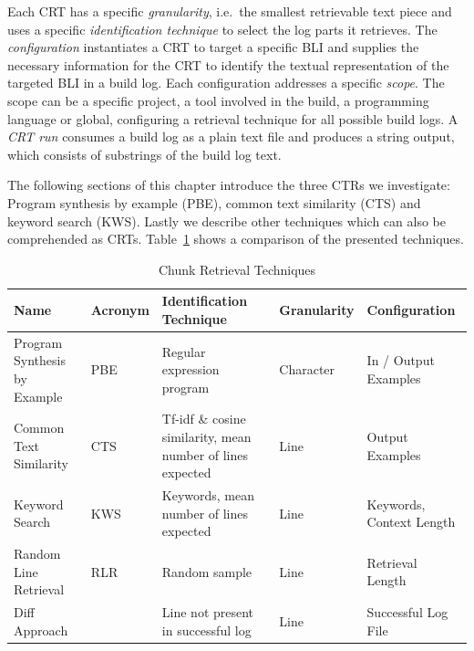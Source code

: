 \documentclass[\myrootdir/main.tex]{subfiles}
\begin{document}
Each CRT has a specific \textit{granularity}, i.e.\ the smallest retrievable text piece and uses a specific \textit{identification technique} to select the log parts it retrieves.
The \textit{configuration} instantiates a CRT to target a specific BLI and supplies the necessary information for the CRT to identify the textual representation of the targeted BLI in a build log.
Each configuration addresses a specific \textit{scope}.
The scope can be a specific project, a tool involved in the build, a programming language or global, configuring a retrieval technique for all possible build logs.
A \textit{CRT run} consumes a build log as a plain text file and produces a string output, which consists of substrings of the build log text.

The following sections of this chapter introduce the three CTRs we investigate: Program synthesis by example (PBE), common text similarity (CTS) and keyword search (KWS).
Lastly we describe other techniques which can also be comprehended as CRTs.
Table~\ref{tab:ctr} shows a comparison of the presented techniques.

\begin{table}[htbp]
\centering
\caption{Chunk Retrieval Techniques}
\begin{tabularx}{\textwidth}{|X|l|X|l|X|} 
\hline
Name                         & Acronym & Identification Technique                                   & Granularity & Configuration             \\ 
\hline
\hline
Program Synthesis by Example & PBE     & Regular expression program                                 & Character   & In / Output Examples      \\
\hline
Common Text Similarity       & CTS     & Tf-idf \& cosine similarity, mean number of lines expected & Line        & Output Examples           \\
\hline
Keyword Search               & KWS     & Keywords, mean number of lines expected                    & Line        & Keywords, Context Length  \\
\hline
Random Line Retrieval        & RLR     & Random sample                                              & Line        & Retrieval Length          \\
\hline
Diff Approach                &         & Line not present in successful log                         & Line        & Successful Log File       \\
\hline
\end{tabularx}
\label{tab:ctr}
\end{table}
\end{document}
